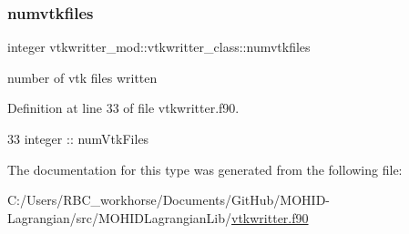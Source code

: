 \subsubsection{\texorpdfstring{numvtkfiles}{numvtkfiles}}
{\footnotesize\ttfamily integer vtkwritter\+\_\+mod\+::vtkwritter\+\_\+class\+::numvtkfiles\hspace{0.3cm}{\ttfamily [private]}}



number of vtk files written 



Definition at line 33 of file vtkwritter.\+f90.


\begin{DoxyCode}
33         \textcolor{keywordtype}{integer} :: numVtkFiles
\end{DoxyCode}


The documentation for this type was generated from the following file\+:\begin{DoxyCompactItemize}
\item 
C\+:/\+Users/\+R\+B\+C\+\_\+workhorse/\+Documents/\+Git\+Hub/\+M\+O\+H\+I\+D-\/\+Lagrangian/src/\+M\+O\+H\+I\+D\+Lagrangian\+Lib/\mbox{\hyperlink{vtkwritter_8f90}{vtkwritter.\+f90}}\end{DoxyCompactItemize}
